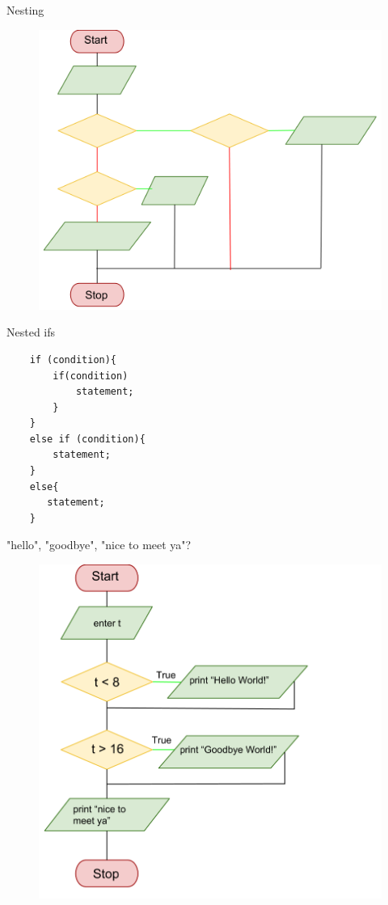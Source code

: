 \documentclass[xcolor={dvipsnames}]{beamer}
\begin{document}
\begin{frame}{Nesting}
\begin{center}	
	\begin{figure}
		\includegraphics[width=.9\textwidth]{nesting}
	\end{figure}
	\end{center}
\end{frame}

\begin{frame}[fragile]{Nested ifs}
\begin{verbatim}
    if (condition){
        if(condition)
            statement;
        }
    }
    else if (condition){
        statement;
    }
    else{
       statement;
    }
\end{verbatim}
\end{frame}


\begin{frame}{"hello", "goodbye", "nice to meet ya"?}
	\begin{center}	
	\begin{figure}
		\includegraphics[width=.7\textwidth]{idif}
	\end{figure}
	\end{center}
\end{frame}
\end{document}
